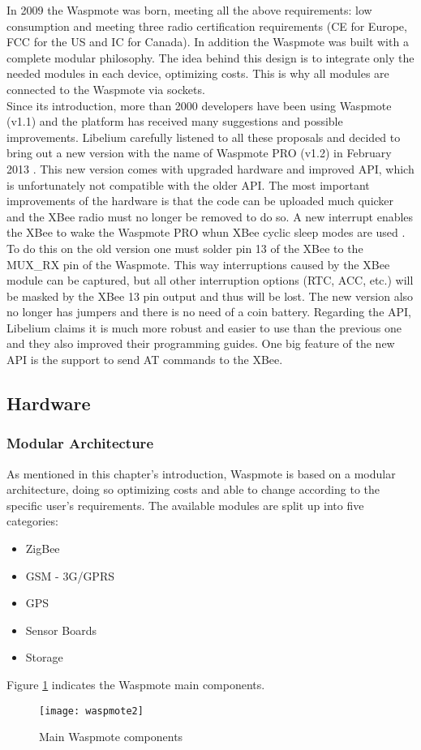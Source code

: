 In 2009 the Waspmote was born, meeting all the above requirements: low consumption and meeting three radio certification requirements (CE for Europe, FCC for the US and IC for Canada). In addition the Waspmote was built with a complete modular philosophy. The idea behind this design is to integrate only the needed modules in each device, optimizing costs. This is why all modules are connected to the Waspmote via sockets.\\Since its introduction, more than 2000 developers have been using Waspmote (v1.1) and the platform has received many suggestions and possible improvements. Libelium carefully listened to all these proposals and decided to bring out a new version with the name of Waspmote PRO (v1.2) in February 2013 . This new version comes with upgraded hardware and improved API, which is unfortunately not compatible with the older API. The most important improvements of the hardware is that the code can be uploaded much quicker and the XBee radio must no longer be removed to do so. A new interrupt enables the XBee to wake the Waspmote PRO whun XBee cyclic sleep modes are used . To do this on the old version one must solder pin 13 of the XBee to the MUX\_RX pin of the Waspmote. This way interruptions caused by the XBee module can be captured, but all other interruption options (RTC, ACC, etc.) will be masked by the XBee 13 pin output and thus will be lost.  The new version also no longer has jumpers and there is no need of a coin battery. Regarding the API, Libelium claims it is much more robust and easier to use than the previous one and they also improved their programming guides. One big feature of the new API is the support to send AT commands to the XBee.
\subsection{Hardware}
\subsubsection{Modular Architecture}
As mentioned in this chapter's introduction, Waspmote is based on a modular architecture, doing so optimizing costs and able to change according to the specific user's requirements. The available modules are split up into five categories:
\begin{itemize}
\item ZigBee
\item GSM - 3G/GPRS
\item GPS
\item Sensor Boards
\item Storage
\end{itemize}  
Figure \ref{fig:waspMote1} indicates the Waspmote main components.
\begin{figure}[ht]
\centering
\texttt{[image: waspmote2]}
\caption{Main Waspmote components}
\label{fig:waspMote1}
\end{figure}
